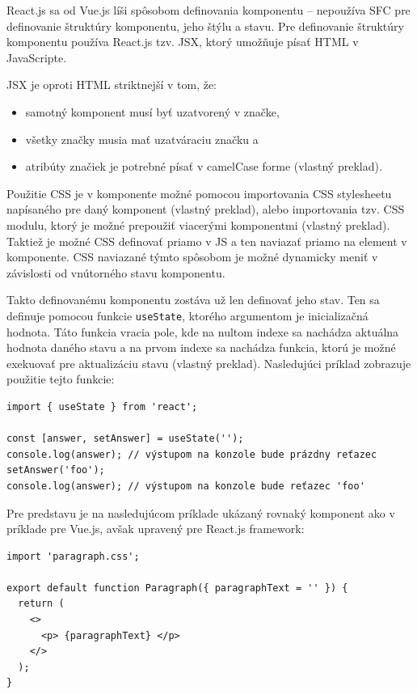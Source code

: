 React.js sa od Vue.js líši spôsobom definovania komponentu -- nepoužíva SFC pre definovanie štruktúry komponentu, jeho štýlu a stavu. Pre definovanie štruktúry komponentu používa React.js tzv. JSX, ktorý umožňuje písať HTML v JavaScripte. \clearpage

JSX je oproti HTML striktnejší v tom, že:
\begin{itemize}
\item {samotný komponent musí byť uzatvorený v značke,}
\item {všetky značky musia mať uzatváraciu značku a}
\item {atribúty značiek je potrebné písať v camelCase forme \cite{jsx_rules} (vlastný preklad).}
\end{itemize}

Použitie CSS je v komponente možné pomocou importovania CSS stylesheetu napísaného pre daný komponent \cite{reactjs_stylesheet} (vlastný preklad), alebo importovania tzv. CSS modulu, ktorý je možné prepoužiť viacerými komponentmi \cite{reactjs_stylesheet_module} (vlastný preklad). Taktiež je možné CSS definovať priamo v JS a ten naviazať priamo na element v komponente. CSS naviazané týmto spôsobom je možné dynamicky meniť v závislosti od vnútorného stavu komponentu.

Takto definovanému komponentu zostáva už len definovať jeho stav. Ten sa definuje pomocou funkcie \texttt{useState}, ktorého argumentom je inicializačná hodnota. Táto funkcia vracia pole, kde na nultom indexe sa nachádza aktuálna hodnota daného stavu a na prvom indexe sa nachádza funkcia, ktorú je možné exekuovať pre aktualizáciu stavu \cite{react_state} (vlastný preklad). Nasledujúci príklad zobrazuje použitie tejto funkcie:
\begin{verbatim}
import { useState } from 'react';

const [answer, setAnswer] = useState('');
console.log(answer); // výstupom na konzole bude prázdny reťazec
setAnswer('foo');
console.log(answer); // výstupom na konzole bude reťazec 'foo'
\end{verbatim}

Pre predstavu je na nasledujúcom príklade ukázaný rovnaký komponent ako v príklade pre Vue.js, avšak upravený pre React.js framework:
\begin{verbatim}
import 'paragraph.css';

export default function Paragraph({ paragraphText = '' }) {
  return (
    <>
      <p> {paragraphText} </p>
    </>
  );
}
\end{verbatim}

